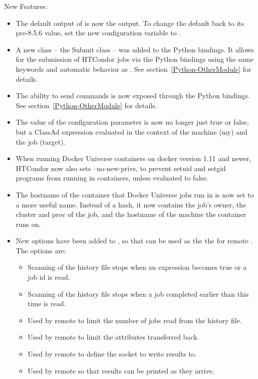 \noindent New Features:

\begin{itemize}

\item The default output of  is now the  output.
To change the default back to its pre-8.5.6 value, set the new
configuration variable  to
.

\item A new class -- the Submit class -- was added to the Python
bindings. It allows for the submission of HTCondor jobs via the
Python bindings using the same keywords and automatic behavior as
.
See section~\ref{Python-OtherModule} for details.

\item The ability to send  commands is now exposed
through the Python bindings.
See section~\ref{Python-OtherModule} for details.

\item The value of the configuration parameter 
 is now no longer just
true or false, but a ClassAd expression evaluated in the context
of the machine (my) and the job (target).

\item When running Docker Universe containers on docker version 1.11
and newer, HTCondor now also sets --no-new-privs, to prevent
setuid and setgid programs from running in containers, unless
 evaluated to false.

\item The hostname of the container that Docker Universe jobs
run in is now set to a more useful name.  Instead of a hash, it
now contains the job's owner, the cluster and proc of the job,
and the hostname of the machine the container runs on.

\item New options have been added to , so that  can be used as the
the  for remote . The options are:
  \begin{itemize}
  \item {} Scanning of the history file stops when an expression becomes true or a job id is read.
  \item {} Scanning of the history file stops when a job completed earlier than this time is read.
  \item {} Used by remote  to limit the number of jobs read from the history file.
  \item {} Used by remote  to limit the attributes transferred back.
  \item {} Used by remote  to define the socket to write results to.
  \item {} Used by remote  so that results can be printed as they arrive.
  \end{itemize}


\end{itemize}
